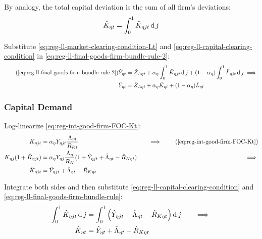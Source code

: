 \documentclass[
thesis.tex
]{subfiles}
\begin{document}
By analogy, the total capital deviation is the sum of all firm's deviations:
\begin{align}
	\hat{K}_{\eta t} = \int_{0}^{1} \hat{K}_{\eta jt} \operatorname{d} j \label{eq:reg-ll-capital-clearing-condition}
\end{align}

Substitute \ref{eq:reg-ll-market-clearing-condition-Lt} and \ref{eq:reg-ll-capital-clearing-condition} in \ref{eq:reg-ll-final-goods-firm-bundle-rule-2}:
\begin{align}
	\tag{\ref{eq:reg-ll-final-goods-firm-bundle-rule-2}}
	\hat{Y}_{\eta t} &= \hat{Z}_{A\eta t} + {\alpha_{\eta}} \int_{0}^{1} \hat{K}_{\eta jt} \dif j + (1-{\alpha_{\eta}}) \int_{0}^{1} \hat{L}_{\eta jt} \dif j \implies \\
	\hat{Y}_{\eta t} &= \hat{Z}_{A\eta t} + {\alpha_{\eta}} \hat{K}_{\eta t} + (1-{\alpha_{\eta}}) \hat{L}_{\eta t} \label{eq:reg-ll-final-goods-firm-bundle-rule-3}
\end{align}


\subsubsection*{Capital Demand}

Log-linearize \ref{eq:reg-int-good-firm-FOC-Kt}:
\begin{alignat}{2}
	K_{\eta jt} &= {\alpha_{\eta}} Y_{\eta jt} \frac{\Lambda_{\eta t}}{R_{Kt}} &\implies \tag{\ref{eq:reg-int-good-firm-FOC-Kt}} \\
	K_{\eta j} (1+ \hat{K}_{\eta jt}) &= {\alpha_{\eta}} Y_{\eta j} \frac{\Lambda_{\eta}}{R_{K}} (1+ \hat{Y}_{\eta jt} + \hat{\Lambda}_{\eta t} - \hat{R}_{K \eta t}) \quad &\implies \nonumber \\
	\hat{K}_{\eta jt} &= \hat{Y}_{\eta jt} + \hat{\Lambda}_{\eta t} - \hat{R}_{K \eta t} \nonumber
\end{alignat}

Integrate both sides and then substitute \ref{eq:reg-ll-capital-clearing-condition} and \ref{eq:reg-ll-final-goods-firm-bundle-rule}:
\begin{alignat}{2}
	\int_{0}^{1} \hat{K}_{\eta jt} \operatorname{d} j &= \int_{0}^{1} \left( \hat{Y}_{\eta jt} + \hat{\Lambda}_{\eta t} - \hat{R}_{K \eta t} \right) \operatorname{d} j \quad &\implies \nonumber \\
	\hat{K}_{\eta t} &= \hat{Y}_{\eta t} + \hat{\Lambda}_{\eta t} - \hat{R}_{K \eta t} \label{eq:reg-ll-int-good-firm-FOC-Kt}
\end{alignat}
\end{document}
